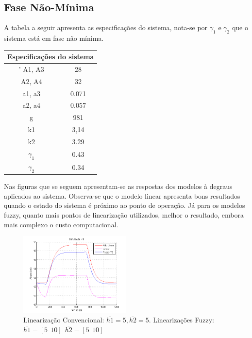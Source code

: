 \subsection{Fase Não-Mínima}
A tabela a seguir apresenta as especificações do sistema, nota-se por $\gamma_1$ e $\gamma_2$ que o sistema está em fase não mínima.
\begin{center}
	\begin{tabular}{|c|c|}
		\hline
		\multicolumn{2}{|c|}{Especificações do sistema} \\
		\hline'
		A1, A3 & 28 \\ \hline
		A2, A4 & 32 \\ \hline
		a1, a3 & 0.071 \\ \hline
		a2, a4 & 0.057 \\ \hline
		g & 981 \\ \hline
		k1 & 3,14 \\ \hline
		k2 & 3.29 \\ \hline
		$\gamma_1$ & 0.43 \\ \hline
		$\gamma_2$ & 0.34 \\ \hline
		\hline
	\end{tabular}
\end{center}

Nas figuras que se seguem apresentam-se as respostas dos modelos à degraus aplicados ao sistema.  Observa-se que o modelo linear apresenta bons resultados quando o estado do sistema é próximo ao ponto de operação. Já para os modelos fuzzy, quanto mais pontos de linearização utilizados, melhor o resultado, embora mais complexo o custo computacional.

\begin{figure}[H]
	\includegraphics[width=0.5\textwidth]{img/h1Fuz5_10.png}
	\caption{\small Linearização Convencional: $ \bar{h1}=5, \bar{h2}=5$. Linearizações Fuzzy: $\bar{h1}=[5 \ \ 10] \ \ \bar{h2}=[5 \ \ 10]$ }
	\label{figH1FNM_1}
\end{figure}

